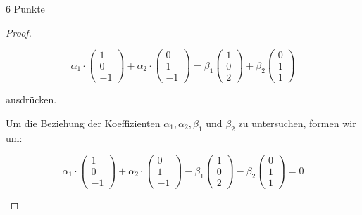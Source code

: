 \documentclass{problemset}
\begin{document}
\begin{problem}{6 Punkte}
\begin{proof}
\begin{enumerate}
              \[
                  \alpha_1 \cdot \begin{pmatrix}
                      1 \\
                      0 \\
                      -1
                  \end{pmatrix} + \alpha_2 \cdot \begin{pmatrix}
                      0 \\
                      1 \\
                      -1
                  \end{pmatrix} = \beta_1 \begin{pmatrix}
                      1 \\ 0 \\ 2
                  \end{pmatrix} + \beta_2 \begin{pmatrix}
                      0 \\ 1 \\ 1
                  \end{pmatrix}
              \]

              ausdrücken.

              Um die Beziehung der Koeffizienten \(\alpha_1, \alpha_2,
              \beta_1\) und \(\beta_2\) zu untersuchen, formen wir um:

              \[
                  \alpha_1 \cdot \begin{pmatrix}
                      1 \\
                      0 \\
                      -1
                  \end{pmatrix} + \alpha_2 \cdot \begin{pmatrix}
                      0 \\
                      1 \\
                      -1
                  \end{pmatrix} - \beta_1 \begin{pmatrix}
                      1 \\ 0 \\ 2
                  \end{pmatrix} - \beta_2 \begin{pmatrix}
                      0 \\ 1 \\ 1
                  \end{pmatrix} = 0
              \]


\end{enumerate}
\end{proof}
\end{problem}
\end{document}
